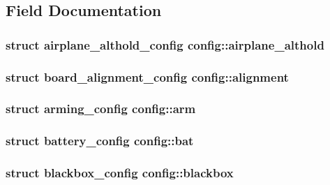 \subsection{Field Documentation}
\hypertarget{structconfig_a97e27d1fff52c6cb89e815dae9e4817a}{
\subsubsection[{airplane\+\_\+althold}]{\setlength{\rightskip}{0pt plus 5cm}struct {\bf airplane\+\_\+althold\+\_\+config} config\+::airplane\+\_\+althold}}\label{structconfig_a97e27d1fff52c6cb89e815dae9e4817a}
\hypertarget{structconfig_a0b68de3c83b070e882796f13cbb9d9a7}{
\subsubsection[{alignment}]{\setlength{\rightskip}{0pt plus 5cm}struct {\bf board\+\_\+alignment\+\_\+config} config\+::alignment}}\label{structconfig_a0b68de3c83b070e882796f13cbb9d9a7}
\hypertarget{structconfig_a2f5e310909b7ea125f33e7e3a43cc3f1}{
\subsubsection[{arm}]{\setlength{\rightskip}{0pt plus 5cm}struct {\bf arming\+\_\+config} config\+::arm}}\label{structconfig_a2f5e310909b7ea125f33e7e3a43cc3f1}
\hypertarget{structconfig_ab0e325a2604d16377941d81d648d818a}{
\subsubsection[{bat}]{\setlength{\rightskip}{0pt plus 5cm}struct {\bf battery\+\_\+config} config\+::bat}}\label{structconfig_ab0e325a2604d16377941d81d648d818a}
\hypertarget{structconfig_aa1d63939b04ed1035f2209dff0b5c0cf}{
\subsubsection[{blackbox}]{\setlength{\rightskip}{0pt plus 5cm}struct {\bf blackbox\+\_\+config} config\+::blackbox}}\label{structconfig_aa1d63939b04ed1035f2209dff0b5c0cf}
